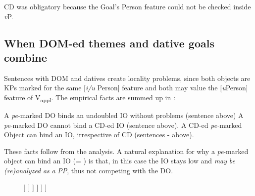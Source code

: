 \documentclass[output=paper,colorlinks,citecolor=brown,nonflat]{./langscibook}
\begin{document}
CD was obligatory because the Goal’s Person feature could not be checked inside \textit{v}P.

\subsection{{When} {DOM-ed} {themes} {and} {dative} {goals} {combine}}%

Sentences with DOM and datives create locality problems, since both objects are KPs marked for the same [\textit{i/u} Person] feature and both may value the [\textit{u}Person] feature of V\textsubscript{appl}. The empirical facts are summed up in :

\ea%
   \label{ex:cornilescu:30}
  	\ea A \textit{pe}-marked DO binds an undoubled IO without problems (sentence  above) \label{ex:cornilescu:30a}
  	\ex A \textit{pe}-marked DO cannot bind a CD-ed IO (sentence  above). \label{ex:cornilescu:30b}
  	\ex A CD-ed \textit{pe-}marked Object can bind an IO, irrespective of CD (sentences - above). \label{ex:cornilescu:30c}
   \z
   \z

 
These facts follow from the analysis. A natural explanation for why a \textit{pe}{}-marked object can bind an IO (= ) is that, in this case the IO stays low and \textit{may} \textit{be} \textit{(re)analyzed} \textit{as} \textit{a} \textit{PP}, thus not competing with the DO. 

\begin{figure}%
	\begin{forest}
		[\textit{v}P
			[\textit{v}\\
				 {[}\textit{u}Case:\_\_{]}
			]
			[${\alpha}$P
				[KP\textsubscript{DO}\\
					 {[}\textit{i}Pers{]}\\
					 {[}\textit{u}Case:\textsc{acc}{]}
				]
				[${\alpha}$P
					[${\alpha}$'
					]
					[VP
						[<KP\textsubscript{DO}>
						]
						[V'
							[V]
							[PP
								[P]
								[KP\textsubscript{IO}]
							]
						]
					]
				]
			]
		]
	\end{forest}
	\caption{\label{fig:cornilescu:11} \missingcaption}
\end{figure}
  
\end{document}
